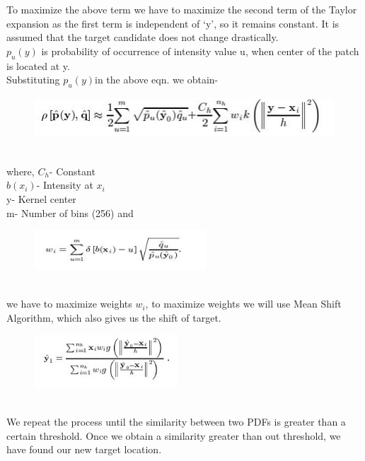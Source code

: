 \documentclass[a4paper,12pt,oneside]{book}
\begin{document}
To maximize the above term we have to maximize the second term of the Taylor expansion as the first term is independent of ‘y’, so it remains constant.
It is assumed that the target candidate does not change drastically.\\
$p_u (y)$ is probability of occurrence of intensity value u, when center of the patch is located at y. \\
Substituting $p_u (y)$in the above eqn. we obtain-\\
    \begin{figure}[h!]  
    \includegraphics[width=1\linewidth, height=1.5cm]{eq6.jpg}
	\end{figure}\\
    where,
    $C_h$- Constant\\
$b(x_i)$- Intensity at $x_i$\\
y- Kernel center\\
m- Number of bins (256) and\\
\begin{figure}[h!]  
    \includegraphics[width=0.4\linewidth, height=1.5cm]{eq7.jpg}
	\end{figure}\\
	we have to maximize weights $w_i$, to maximize weights we will use Mean Shift Algorithm, which also gives us the shift of target.\\
	\begin{figure}[h!]  
    \includegraphics[width=0.5\linewidth, height=2cm]{eq8.jpg}
	\end{figure}\\
	We repeat the process until the similarity between two PDFs is greater than a certain threshold.
    Once we obtain a similarity greater than out threshold, we have found our new target location.\\ 
\end{document}
